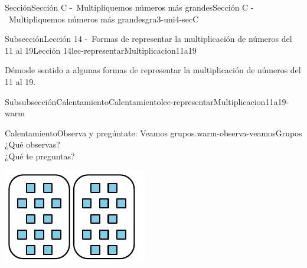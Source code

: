 \documentclass[twoside,10pt,]{article}
\begin{document}
\begin{sectionptx}{Sección}{Sección C -~Multipliquemos números más grandes}{}{Sección C -~Multipliquemos números más grandes}{}{}{gra3-uni4-secC}
%
%
\typeout{************************************************}
\typeout{************************************************}
%
\begin{subsectionptx}{Subsección}{Lección 14 -~Formas de representar la multiplicación de números del 11 al 19}{}{Lección 14}{}{}{lec-representarMultiplicacion11a19}
\begin{introduction}{}%
Démosle sentido a algunas formas de representar la multiplicación de números del 11 al 19.%
\end{introduction}%
%
%
\typeout{************************************************}
\typeout{************************************************}
%
\begin{subsubsectionptx}{Subsubsección}{Calentamiento}{}{Calentamiento}{}{}{lec-representarMultiplicacion11a19-warm}
\begin{exploration}{Calentamiento}{Observa y pregúntate: Veamos grupos.}{warm-observa-veamosGrupos}%
¿Qué observas?\\
 ¿Qué te preguntas?%
\begin{sidebyside}{3}{0}{0}{0}%
\begin{sbspanel}{0.333333333333333}%
\includegraphics[width=\linewidth]{external/svg-source/tikz-file-149346-scale13.pdf}
\end{sbspanel}%
\begin{sbspanel}{0.333333333333333}%

\end{sbspanel}
\end{sidebyside}
\end{exploration}
\end{subsubsectionptx}
\end{subsectionptx}
\end{sectionptx}
\end{document}
